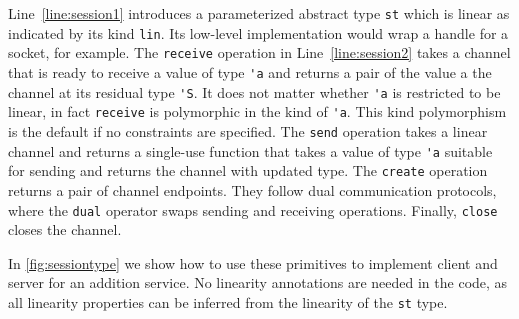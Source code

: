 Line~\ref{line:session1} introduces a parameterized abstract
type \lstinline{st} which is linear as indicated
by its kind \lstinline{lin}. Its low-level implementation would wrap a
handle for a socket, for example. The \lstinline{receive}  operation
in Line~\ref{line:session2} takes a channel that is ready to receive a
value of type \lstinline{'a} and returns a pair of the value a the
channel at its residual type \lstinline{'S}. It does not matter
whether \lstinline{'a} is restricted to be linear, in fact
\lstinline{receive} is polymorphic in the kind of \lstinline{'a}.
This kind polymorphism is the
default if no constraints are specified.
%
The \lstinline{send} operation takes a linear channel and returns a
single-use function that takes a value of type \lstinline{'a} suitable
for sending and returns the channel with updated type.
%
The \lstinline{create} operation returns a pair of channel
endpoints. They follow dual communication protocols, where the
\lstinline{dual} operator swaps sending and receiving operations.
%
Finally, \lstinline{close} closes the channel.

In \cref{fig:sessiontype} we show how to use these primitives to
implement client and server for an addition service.
No linearity annotations are needed in the code, as all linearity
properties can be inferred from the linearity of the \texttt{st} type.

